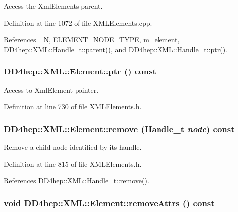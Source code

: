 Access the XmlElements parent. 

Definition at line 1072 of file XMLElements.cpp.

References \_\-N, ELEMENT\_\-NODE\_\-TYPE, m\_\-element, DD4hep::XML::Handle\_\-t::parent(), and DD4hep::XML::Handle\_\-t::ptr().\hypertarget{class_d_d4hep_1_1_x_m_l_1_1_element_ac9a29b81894acb1480d098d33b2b820f}{
\subsubsection[{ptr}]{ DD4hep::XML::Element::ptr () const}}
\label{class_d_d4hep_1_1_x_m_l_1_1_element_ac9a29b81894acb1480d098d33b2b820f}


Access to XmlElement pointer. 

Definition at line 730 of file XMLElements.h.\hypertarget{class_d_d4hep_1_1_x_m_l_1_1_element_aa4c8525669df70abc7b72d8bd9847b1e}{
\subsubsection[{remove}]{ DD4hep::XML::Element::remove ({\bf Handle\_\-t} {\em node}) const}}
\label{class_d_d4hep_1_1_x_m_l_1_1_element_aa4c8525669df70abc7b72d8bd9847b1e}


Remove a child node identified by its handle. 

Definition at line 815 of file XMLElements.h.

References DD4hep::XML::Handle\_\-t::remove().\hypertarget{class_d_d4hep_1_1_x_m_l_1_1_element_a69779ea432a174b590f120949176ef33}{
\subsubsection[{removeAttrs}]{\setlength{\rightskip}{0pt plus 5cm}void DD4hep::XML::Element::removeAttrs () const}}
\label{class_d_d4hep_1_1_x_m_l_1_1_element_a69779ea432a174b590f120949176ef33}



